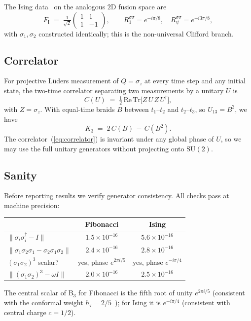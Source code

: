 \documentclass[aps,prx,reprint,amsmath,amssymb,floatfix,nofootinbib,superscriptaddress]{revtex4-2}
\begin{document}
The Ising data~\cite{NayakSimonStern2008} on the analogous $2$D
fusion space are
\begin{equation}
  F_{\mathrm{I}} \;=\; \tfrac{1}{\sqrt{2}}
  \begin{pmatrix} 1 & 1 \\ 1 & -1 \end{pmatrix},
  \qquad
  R^{\sigma\sigma}_{1} = e^{-i\pi/8},
  \quad
  R^{\sigma\sigma}_{\psi} = e^{+i 3\pi/8},
\end{equation}
with $\sigma_{1},\sigma_{2}$ constructed identically; this is the
non-universal Clifford branch.

\subsection{Correlator}

For projective L\"uders measurement of $Q=\sigma_{z}$ at every time
step and any initial state, the two-time correlator separating two
measurements by a unitary $U$ is
\begin{equation}
  C(U) \;=\; \tfrac{1}{2}\,\mathrm{Re}\,\mathrm{Tr}\bigl[Z\,U\,Z\,U^{\dagger}\bigr],
\label{eq:correlator}
\end{equation}
with $Z=\sigma_{z}$. With equal-time braids $B$ between $t_{1}$--$t_{2}$
and $t_{2}$--$t_{3}$, so $U_{13}=B^{2}$, we have
\begin{equation}
  K_{3} \;=\; 2\,C(B) \,-\, C(B^{2}).
\end{equation}
The correlator~(\ref{eq:correlator}) is invariant under any global
phase of $U$, so we may use the full unitary generators without
projecting onto $\mathrm{SU}(2)$.

\subsection{Sanity}

Before reporting results we verify generator consistency. All checks
pass at machine precision:
\begin{center}\small
\begin{tabular}{lcc}
\toprule
& Fibonacci & Ising \\
\midrule
$\|\sigma_{i}\sigma_{i}^{\dagger}-I\|$ & $1.5\times10^{-16}$ & $5.6\times10^{-16}$ \\
$\|\sigma_{1}\sigma_{2}\sigma_{1}-\sigma_{2}\sigma_{1}\sigma_{2}\|$
                                      & $2.4\times10^{-16}$ & $2.8\times10^{-16}$ \\
$(\sigma_{1}\sigma_{2})^{3}$ scalar?  & yes, phase $e^{2\pi i/5}$
                                      & yes, phase $e^{-i\pi/4}$ \\
$\|(\sigma_{1}\sigma_{2})^{3}-\omega I\|$
                                      & $2.0\times10^{-16}$ & $2.5\times10^{-16}$ \\
\bottomrule
\end{tabular}
\end{center}
The central scalar of B$_{3}$ for Fibonacci is the fifth root of unity
$e^{2\pi i/5}$ (consistent with the conformal weight
$h_{\tau} = 2/5$~\cite{NayakSimonStern2008}); for Ising it is
$e^{-i\pi/4}$ (consistent with central charge $c=1/2$).
\end{document}
